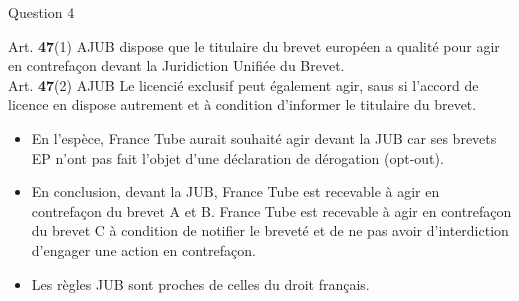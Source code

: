 \begin{frame}{Question 4}

\begin{block}{}
Art. \textbf{47}(1) AJUB dispose que le titulaire du brevet européen a qualité pour agir
    en contrefaçon devant la Juridiction Unifiée du Brevet. \\
Art. \textbf{47}(2) AJUB Le licencié exclusif peut également agir, saus si l'accord
de licence en dispose autrement et à condition d'informer le titulaire du brevet.
\end{block}

\begin{itemize}
    \item En l'espèce, France Tube aurait souhaité agir devant la JUB car ses brevets EP
    n'ont pas fait l'objet d'une déclaration de dérogation (opt-out).
    \item En conclusion, devant la JUB, France Tube est recevable à agir en contrefaçon du brevet A et B.
    France Tube est recevable à agir en contrefaçon du brevet C à
    condition de notifier le breveté et de ne pas avoir d'interdiction d'engager
    une action en contrefaçon.
\end{itemize}

\begin{itemize}
    \item Les règles JUB sont proches de celles du droit français.
\end{itemize}

\end{frame}
